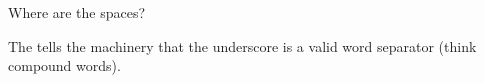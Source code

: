 \startbuffer
\nospaces\plusthree
\spacechar\underscoreasciicode
\hccode\underscoreasciicode\underscoreasciicode
Where are the spaces?
\stopbuffer

\typebuffer

The  tells the machinery that the underscore is a valid word
separator (think compound words).

\getbuffer

\stopsectionlevel

\stopdocument

%
%
%
%

